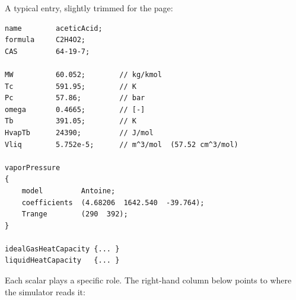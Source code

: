 \documentclass[11pt,a4paper]{article}
\begin{document}
A typical entry, slightly trimmed for the page:
\begin{lstlisting}
name        aceticAcid;
formula     C2H4O2;
CAS         64-19-7;

MW          60.052;        // kg/kmol
Tc          591.95;        // K
Pc          57.86;         // bar
omega       0.4665;        // [-]
Tb          391.05;        // K
HvapTb      24390;         // J/mol
Vliq        5.752e-5;      // m^3/mol  (57.52 cm^3/mol)

vaporPressure
{
    model         Antoine;
    coefficients  (4.68206  1642.540  -39.764);
    Trange        (290  392);
}

idealGasHeatCapacity {... }
liquidHeatCapacity   {... }
\end{lstlisting}

Each scalar plays a specific role.  The right-hand column below points
to where the simulator reads it:
\end{document}
